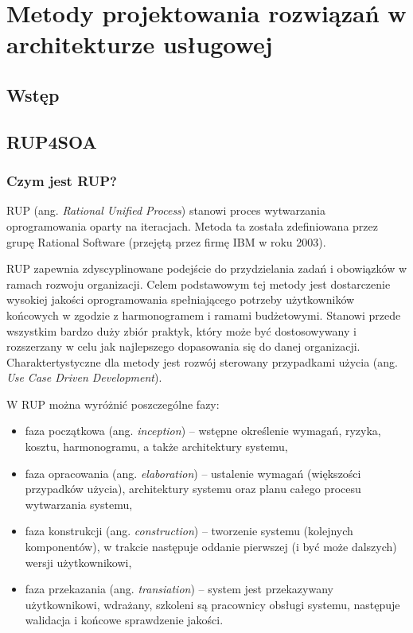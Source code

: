 \chapter{Metody projektowania rozwiązań w architekturze usługowej}

\section{Wstęp}

\section{RUP4SOA}
\subsection{Czym jest RUP?}
RUP (ang. \textit{Rational Unified Process}) stanowi proces  wytwarzania oprogramowania oparty na iteracjach. Metoda ta została zdefiniowana przez grupę Rational Software (przejętą przez firmę IBM w roku 2003). 

RUP zapewnia zdyscyplinowane podejście do przydzielania zadań i obowiązków w ramach rozwoju organizacji. Celem podstawowym tej metody jest dostarczenie wysokiej jakości oprogramowania spełniającego potrzeby użytkowników końcowych w zgodzie z harmonogramem i ramami budżetowymi. \cite{RUPIntRat} Stanowi przede wszystkim bardzo duży zbiór praktyk, który może być dostosowywany i rozszerzany w celu jak najlepszego dopasowania się do danej organizacji. Charaktertystyczne dla metody jest rozwój sterowany przypadkami użycia (ang. \textit{Use Case Driven Development}). \cite{RUPMartFow}

W RUP można wyróżnić poszczególne fazy:
\begin{itemize}
\item{faza początkowa (ang. \textit{inception}) – wstępne określenie wymagań, ryzyka, kosztu, harmonogramu, a także architektury systemu,}
\item{faza opracowania (ang. \textit{elaboration}) – ustalenie wymagań (większości przypadków użycia), architektury systemu oraz planu całego procesu wytwarzania systemu,}
\item{faza konstrukcji (ang. \textit{construction}) – tworzenie systemu (kolejnych komponentów), w trakcie następuje oddanie pierwszej (i być może dalszych) wersji użytkownikowi,}
\item{faza przekazania (ang. \textit{transiation}) – system jest przekazywany użytkownikowi, wdrażany, szkoleni są pracownicy obsługi systemu, następuje walidacja i końcowe sprawdzenie jakości.} \cite{RUPIntRat}
\end{itemize}
